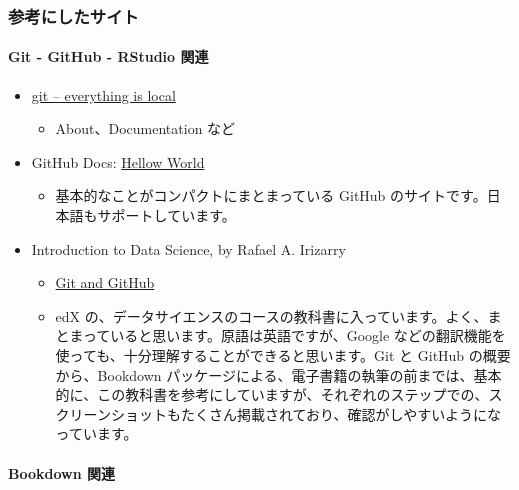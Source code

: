 \documentclass[
]{bxjsbook}
\providecommand{\tightlist}{%
  \setlength{\itemsep}{0pt}\setlength{\parskip}{0pt}}
\theoremstyle{definition}
\theoremstyle{definition}
\theoremstyle{definition}
\theoremstyle{definition}
\theoremstyle{remark}
\begin{document}
\hypertarget{ux53c2ux8003ux306bux3057ux305fux30b5ux30a4ux30c8}{%
\subsubsection{参考にしたサイト}\label{ux53c2ux8003ux306bux3057ux305fux30b5ux30a4ux30c8}}

\hypertarget{git---github---rstudio-ux95a2ux9023}{%
\paragraph{Git - GitHub - RStudio 関連}\label{git---github---rstudio-ux95a2ux9023}}

\begin{itemize}
\tightlist
\item
  \href{https://git-scm.com/about}{git -- everything is local}

  \begin{itemize}
  \tightlist
  \item
    About、Documentation など
  \end{itemize}
\item
  GitHub Docs: \href{https://docs.github.com/ja/get-started/quickstart/hello-world}{Hellow World}

  \begin{itemize}
  \tightlist
  \item
    基本的なことがコンパクトにまとまっている GitHub のサイトです。日本語もサポートしています。
  \end{itemize}
\item
  Introduction to Data Science, by Rafael A. Irizarry

  \begin{itemize}
  \tightlist
  \item
    \href{http://rafalab.dfci.harvard.edu/dsbook/git.html\#git}{Git and GitHub}
  \item
    edX の、データサイエンスのコースの教科書に入っています。よく、まとまっていると思います。原語は英語ですが、Google などの翻訳機能を使っても、十分理解することができると思います。Git と GitHub の概要から、Bookdown パッケージによる、電子書籍の執筆の前までは、基本的に、この教科書を参考にしていますが、それぞれのステップでの、スクリーンショットもたくさん掲載されており、確認がしやすいようになっています。
  \end{itemize}
\end{itemize}

\hypertarget{bookdown-ux95a2ux9023}{%
\paragraph{Bookdown 関連}\label{bookdown-ux95a2ux9023}}
\end{document}
